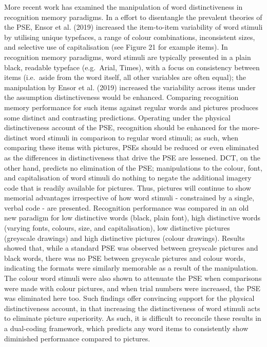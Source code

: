 \documentclass[
  11pt,
]{article}
\begin{document}
More recent work has examined the manipulation of word distinctiveness
in recognition memory paradigms. In a effort to disentangle the
prevalent theories of the PSE, Ensor et al. (2019) increased the
item-to-item variability of word stimuli by utilising unique typefaces,
a range of colour combinations, inconsistent sizes, and selective use of
capitalisation (see Figure 21 for example items). In recognition memory
paradigms, word stimuli are typically presented in a plain black,
readable typeface (e.g.~Arial, Times), with a focus on consistency
between items (i.e.~aside from the word itself, all other variables are
often equal); the manipulation by Ensor et al. (2019) increased the
variability across items under the assumption distinctiveness would be
enhanced. Comparing recognition memory performance for such items
against regular words and pictures produces some distinct and
contrasting predictions. Operating under the physical distinctiveness
account of the PSE, recognition should be enhanced for the more-distinct
word stimuli in comparison to regular word stimuli; as such, when
comparing these items with pictures, PSEs should be reduced or even
eliminated as the differences in distinctiveness that drive the PSE are
lessened. DCT, on the other hand, predicts no elimination of the PSE;
manipulations to the colour, font, and capitalisation of word stimuli do
nothing to negate the additional imagery code that is readily available
for pictures. Thus, pictures will continue to show memorial advantages
irrespective of how word stimuli - constrained by a single, verbal code
- are presented. Recognition performance was compared in an old new
paradigm for low distinctive words (black, plain font), high distinctive
words (varying fonts, colours, size, and capitalisation), low
distinctive pictures (greyscale drawings) and high distinctive pictures
(colour drawings). Results showed that, while a standard PSE was
observed between greyscale pictures and black words, there was no PSE
between greyscale pictures and colour words, indicating the formats were
similarly memorable as a result of the manipulation. The colour word
stimuli were also shown to attenuate the PSE when comparisons were made
with colour pictures, and when trial numbers were increased, the PSE was
eliminated here too. Such findings offer convincing support for the
physical distinctiveness account, in that increasing the distinctiveness
of word stimuli acts to eliminate picture superiority. As such, it is
difficult to reconcile these results in a dual-coding framework, which
predicts any word items to consistently show diminished performance
compared to pictures.
\end{document}
